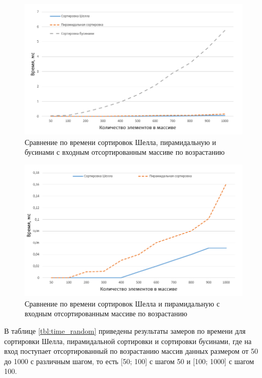 \begin{figure}[h]
	\centering
	\includegraphics[height=0.3\textheight]{img/sort_1.png}
	\caption{Сравнение по времени сортировок Шелла, пирамидальную и бусинами с входным отсортированным массиве по возрастанию}
	\label{plt:sort_1}
\end{figure}

\begin{figure}[h]
	\centering
	\includegraphics[height=0.3\textheight]{img/sort_2.png}
	\caption{Сравнение по времени сортировок Шелла и пирамидальную с входным отсортированным массиве по возрастанию}
	\label{plt:sort_2}
\end{figure}

В таблице \ref{tbl:time_random} приведены результаты замеров по времени для сортировки Шелла, пирамидальной сортировки и сортировки бусинами, где на вход поступает отсортированный по возрастанию массив данных размером от 50 до 1000 с различным шагом, то есть [50; 100] с шагом 50 и [100; 1000] с шагом 100.

\clearpage

